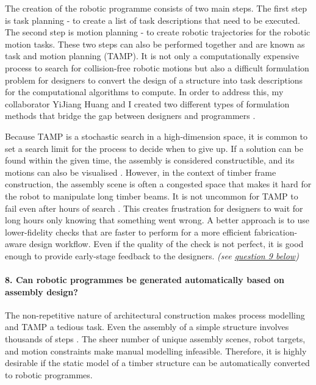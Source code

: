 The creation of the robotic programme consists of two main steps. The first step is task planning - to create a list of task descriptions that need to be executed. The second step is motion planning - to create robotic trajectories for the robotic motion tasks. These two steps can also be performed together and are known as task and motion planning (TAMP). It is not only a computationally expensive process to search for collision-free robotic motions but also a difficult formulation problem for designers to convert the design of a structure into task descriptions for the computational algorithms to compute. In order to address this, my collaborator YiJiang Huang and I created two different types of formulation methods that bridge the gap between designers and programmers .

Because TAMP is a stochastic search in a high-dimension space, it is common to set a search limit for the process to decide when to give up. If a solution can be found within the given time, the assembly is considered constructible, and its motions can also be visualised . However, in the context of timber frame construction, the assembly scene is often a congested space that makes it hard for the robot to manipulate long timber beams. It is not uncommon for TAMP to fail even after hours of search . This creates frustration for designers to wait for long hours only knowing that something went wrong. A better approach is to use lower-fidelity checks that are faster to perform for a more efficient fabrication-aware design workflow. Even if the quality of the check is not perfect, it is good enough to provide early-stage feedback to the designers. \textit{(see \ul{question 9 below})}

\paragraph{8. Can robotic programmes be generated automatically based on assembly design?}

The non-repetitive nature of architectural construction makes process modelling and TAMP a tedious task. Even the assembly of a simple structure involves thousands of steps . The sheer number of unique assembly scenes, robot targets, and motion constraints make manual modelling infeasible. Therefore, it is highly desirable if the static model of a timber structure can be automatically converted to robotic programmes.

